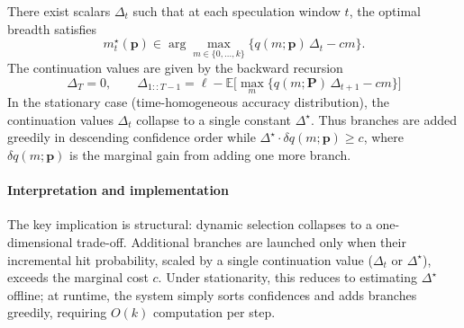 \vspace{10pt}
\begin{theorem}
\label{thm:dynamic-general}
There exist scalars $\Delta_t$ such that at each speculation window $t$, the optimal breadth satisfies
\[
m_t^\star(\mathbf p)
\in
\arg\max_{m \in \{0,\dots,k\}}
\{ q(m;\mathbf p)\,\Delta_t - c m \}.
\]
The continuation values are given by the backward recursion
\[
\Delta_T = 0, \qquad
\Delta_{1::T-1}
=
\ell
-
\mathbb E
\Big[
\max_m \{ q(m;\mathbf P)\,\Delta_{t+1} - c m \}
\Big]
\]
In the stationary case (time-homogeneous accuracy distribution), the continuation values 
$\Delta_t$ collapse to a single constant $\Delta^\star$. Thus branches are added greedily in descending confidence order
while
$\Delta^\star \cdot \delta q(m;\mathbf p) \ge c$, 
where $\delta q(m;\mathbf p)$ is the marginal gain from adding one more branch.
\label{thm:dynamic}
\end{theorem}
\paragraph{Interpretation and implementation}
The key implication is structural: dynamic selection collapses to a one-dimensional trade-off. 
Additional branches are launched only when their incremental hit probability,
scaled by a single continuation value ($\Delta_t$ or $\Delta^\star$),
exceeds the marginal cost $c$.
Under stationarity, this reduces to estimating $\Delta^\star$ offline;
at runtime, the system simply sorts confidences and adds branches greedily,
requiring $O(k)$ computation per step.

